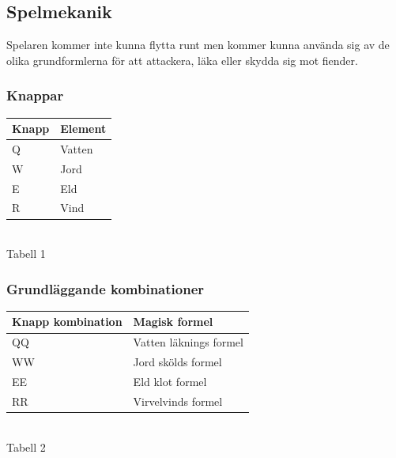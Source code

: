 \documentclass[12pt]{TDP005mall}
\begin{document}
\clearpage

\subsection{Spelmekanik}
Spelaren kommer inte kunna flytta runt men kommer kunna använda sig av de olika grundformlerna för att attackera, läka eller skydda sig mot fiender.

\subsubsection{Knappar}
\begin{table}[H]
\begin{tabular}{|l|l|}
\hline
\textbf{Knapp} & \textbf{Element} \\ \hline
Q              & Vatten           \\ \hline
W              & Jord             \\ \hline
E              & Eld              \\ \hline
R              & Vind             \\ \hline
\end{tabular}\\
Tabell 1

\end{table}

\subsubsection{Grundläggande kombinationer}
\begin{table}[H]
\begin{tabular}{|l|l|}
\hline
\textbf{Knapp kombination} & \textbf{Magisk formel} \\ \hline
QQ                   & Vatten läknings formel \\ \hline
WW                   & Jord skölds formel     \\ \hline
EE                   & Eld klot formel        \\ \hline
RR                   & Virvelvinds formel     \\ \hline
\end{tabular}\\
Tabell 2

\end{table}
\end{document}
